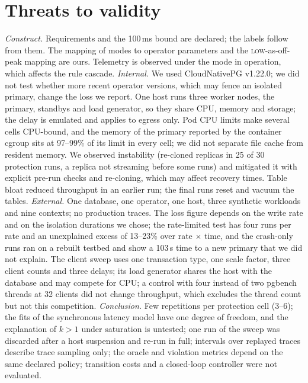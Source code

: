\documentclass[preprint,12pt]{elsarticle}
\begin{document}
\section{Threats to validity}\label{sec:threats}
\emph{Construct.} Requirements and the 100\,ms bound are declared; the labels follow from them. The mapping of modes to operator parameters and the \textsc{low}-as-off-peak mapping are ours. Telemetry is observed under the mode in operation, which affects the rule cascade.
\emph{Internal.} We used CloudNativePG v1.22.0; we did not test whether more recent operator versions, which may fence an isolated primary, change the loss we report. One host runs three worker nodes, the primary, standbys and load generator, so they share CPU, memory and storage; the delay is emulated and applies to egress only. Pod CPU limits make several cells CPU-bound, and the memory of the primary reported by the container cgroup sits at 97--99\% of its limit in every cell; we did not separate file cache from resident memory. We observed instability (re-cloned replicas in 25 of 30 protection runs, a replica not streaming before some runs) and mitigated it with explicit pre-run checks and re-cloning, which may affect recovery times. Table bloat reduced throughput in an earlier run; the final runs reset and vacuum the tables.
\emph{External.} One database, one operator, one host, three synthetic workloads and nine contexts; no production traces. The loss figure depends on the write rate and on the isolation durations we chose; the rate-limited test has four runs per rate and an unexplained excess of 13--23\% over rate $\times$ time, and the crash-only runs ran on a rebuilt testbed and show a 103\,s time to a new primary that we did not explain. The client sweep uses one transaction type, one scale factor, three client counts and three delays; its load generator shares the host with the database and may compete for CPU; a control with four instead of two pgbench threads at 32 clients did not change throughput, which excludes the thread count but not this competition.
\emph{Conclusion.} Few repetitions per protection cell (3--6); the fits of the synchronous latency model have one degree of freedom, and the explanation of $k>1$ under saturation is untested; one run of the sweep was discarded after a host suspension and re-run in full; intervals over replayed traces describe trace sampling only; the oracle and violation metrics depend on the same declared policy; transition costs and a closed-loop controller were not evaluated.
\end{document}
